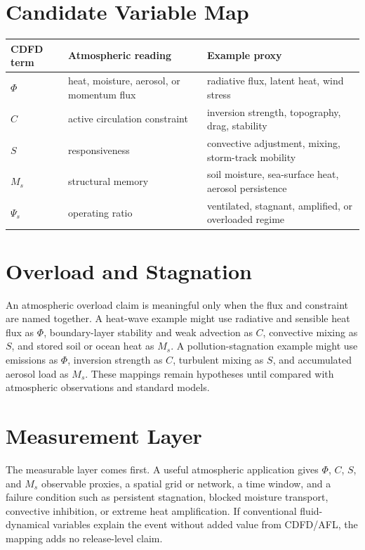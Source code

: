 \documentclass[12pt,a4paper]{article}
\begin{document}
\section{Candidate Variable Map}

\begin{table}[h]
\centering
\begin{tabularx}{\textwidth}{@{}lXX@{}}
\toprule
CDFD term & Atmospheric reading & Example proxy \\
\midrule
$\Phi$ & heat, moisture, aerosol, or momentum flux & radiative flux, latent heat, wind stress \\
$C$ & active circulation constraint & inversion strength, topography, drag, stability \\
$S$ & responsiveness & convective adjustment, mixing, storm-track mobility \\
$M_s$ & structural memory & soil moisture, sea-surface heat, aerosol persistence \\
$\Psi_s$ & operating ratio & ventilated, stagnant, amplified, or overloaded regime \\
\bottomrule
\end{tabularx}
\end{table}

\section{Overload and Stagnation}

An atmospheric overload claim is meaningful only when the flux and constraint
are named together. A heat-wave example might use radiative and sensible heat
flux as $\Phi$, boundary-layer stability and weak advection as $C$, convective
mixing as $S$, and stored soil or ocean heat as $M_s$. A pollution-stagnation
example might use emissions as $\Phi$, inversion strength as $C$, turbulent
mixing as $S$, and accumulated aerosol load as $M_s$. These mappings remain
hypotheses until compared with atmospheric observations and standard models.

\section{Measurement Layer}

The measurable layer comes first. A useful atmospheric application gives
$\Phi$, $C$, $S$, and $M_s$ observable proxies, a spatial grid or network, a time
window, and a failure condition such as persistent stagnation, blocked moisture
transport, convective inhibition, or extreme heat amplification. If conventional
fluid-dynamical variables explain the event without added value from CDFD/AFL,
the mapping adds no release-level claim.
\end{document}
